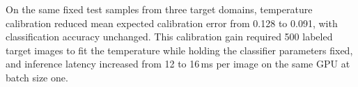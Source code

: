 On the same fixed test samples from three target domains, temperature calibration reduced mean expected calibration error from 0.128 to 0.091, with classification accuracy unchanged. This calibration gain required 500 labeled target images to fit the temperature while holding the classifier parameters fixed, and inference latency increased from 12 to 16\,ms per image on the same GPU at batch size one.
